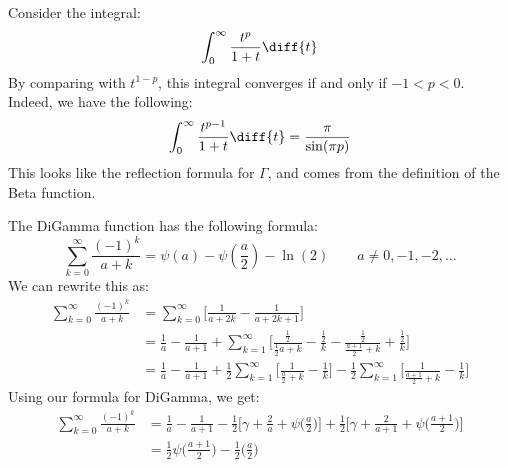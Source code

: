         \begin{lexample}
            Consider the integral:
            \begin{equation}
                \int_{0}^{\infty}\frac{t^{p}}{1+t}\diff{t}
            \end{equation}
            By comparing with $t^{1-p}$, this integral
            converges if and only if $\minus{1}<p<0$.
            Indeed, we have the following:
            \begin{equation}
                \int_{0}^{\infty}\frac{t^{p-1}}{1+t}\diff{t}
                =\frac{\pi}{\sin(\pi{p})}
            \end{equation}
            This looks like the reflection formula for $\Gamma$,
            and comes from the definition of the Beta function.
        \end{lexample}
        The DiGamma function has the following formula:
        \begin{equation}
            \sum_{k=0}^{\infty}\frac{(\minus{1})^{k}}{a+k}
            =\psi(a)-\psi(\frac{a}{2})-\ln(2)
            \quad\quad
            a\ne{0},\minus{1},\minus{2},\dots
        \end{equation}
        We can rewrite this as:
        \begin{subequations}
            \begin{align}
                \sum_{k=0}^{\infty}\frac{(\minus{1})^{k}}{a+k}
                &=\sum_{k=0}^{\infty}\Big[
                    \frac{1}{a+2k}-\frac{1}{a+2k+1}\Big]\\
                &=\frac{1}{a}-\frac{1}{a+1}+\sum_{k=1}^{\infty}\Big[
                    \frac{\frac{1}{2}}{\frac{1}{2}a+k}-
                    \frac{\frac{1}{2}}{k}-
                    \frac{\frac{1}{2}}{\frac{a+1}{2}+k}+
                    \frac{\frac{1}{2}}{k}\Big]\\
                &=\frac{1}{a}-\frac{1}{a+1}+
                    \frac{1}{2}\sum_{k=1}^{\infty}\Big[
                        \frac{1}{\frac{a}{2}+k}-\frac{1}{k}\Big]-
                    \frac{1}{2}\sum_{k=1}^{\infty}\Big[
                        \frac{1}{\frac{a+1}{2}+k}-\frac{1}{k}\Big]
            \end{align}
        \end{subequations}
        Using our formula for DiGamma, we get:
        \begin{subequations}
            \begin{align}
                \sum_{k=0}^{\infty}\frac{(\minus{1})^{k}}{a+k}
                &=\frac{1}{a}-\frac{1}{a+1}-\frac{1}{2}\Big[
                    \gamma+\frac{2}{a}+\psi\big(\frac{a}{2}\big)\Big]+
                    \frac{1}{2}\Big[
                        \gamma+\frac{2}{a+1}+
                        \psi\big(\frac{a+1}{2}\big)
                    \Big]\\
                &=\frac{1}{2}\psi\big(\frac{a+1}{2}\big)-
                    \frac{1}{2}\big(\frac{a}{2}\big)
            \end{align}
        \end{subequations}
